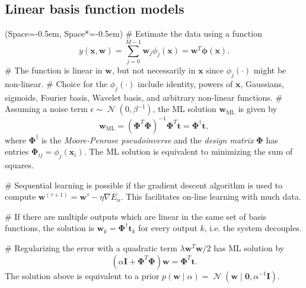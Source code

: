 \documentclass[12pt, a4paper]{article}
\newcommand{\listSpace}{-0.5em}%
\newcommand{\vect}[1]{\bm{#1}}
\DeclareMathOperator{\N}{\mathcal{N}}
\begin{document}
\subsection*{Linear basis function models}
\begin{easylist}[itemize]
	\ListProperties(Space=\listSpace, Space*=\listSpace)
	# Estimate the data using a function
	\begin{equation*}
	y(\vect{x}, \vect{w}) = \sum_{j = 0}^{M-1} \vect{w}_j \phi_j(\vect{x}) = \vect{w}^T \vect{\phi}(\vect{x}).
	\end{equation*}
	# The function is linear in $\vect{w}$, but not necessarily in $\vect{x}$ since $\phi_j (\cdot)$ might be non-linear.
	# Choice for the $\phi_j (\cdot)$ include identity, powers of $\vect{x}$, Gaussians, sigmoids, Fourier basis, Wavelet basis, and arbitrary non-linear functions.
	# Assuming a noise term $\epsilon \sim \N(0, \beta^{-1})$, the ML solution $\vect{w}_\text{ML}$ is given by
	\begin{equation*}
	\vect{w}_\text{ML} = \left(\vect{\Phi}^T \vect{\Phi} \right)^{-1} \vect{\Phi}^T \vect{t} = \vect{\Phi}^\dagger \vect{t},
	\end{equation*}
	where $\vect{\Phi}^\dagger$ is the \emph{Moore-Penrose pseudoinverse} and the \emph{design matrix} $\vect{\Phi}$ has entries $\vect{\Phi}_{ij} = \phi_j(\vect{x}_i)$.
	The ML solution is equivalent to minimizing the sum of squares.
	
	# Sequential learning is possible if the gradient descent algorithm is used to compute $\vect{w}^{(\tau + 1)} = \vect{w}^{\tau} - \eta \nabla E_n$.
	This facilitates on-line learning with much data.
	
	# If there are multiple outputs which are linear in the same set of basis functions, the solution is $\vect{w}_k = \vect{\Phi}^\dagger \vect{t}_k$ for every output $k$, i.e. the system decouples.
	
	# Regularizing the error with a quadratic term $\lambda \vect{w}^T \vect{w} /2$ has ML solution by 
	\begin{equation*}
	\left( \alpha \vect{I} + \vect{\Phi}^T \vect{\Phi} \right)
	\vect{w}
	=
	\vect{\Phi}^T \vect{t}.
	\end{equation*}
	The solution above is equivalent to a prior $p(\vect{w} \mid \alpha) = \N (\vect{w} \mid  \vect{0}, \alpha^{-1} \vect{I})$.
\end{easylist}
\end{document}
